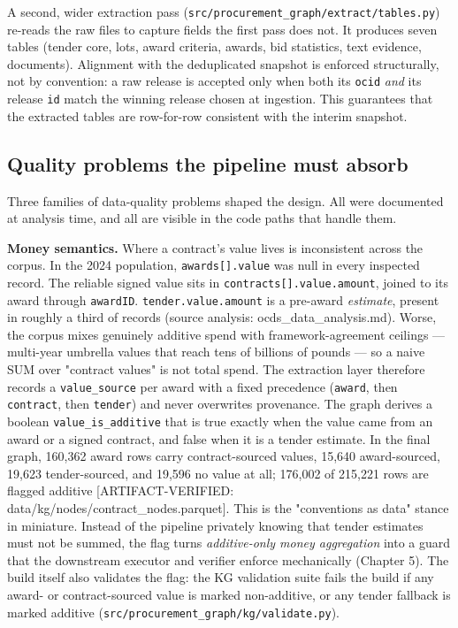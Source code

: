 \documentclass[10pt]{article} %
\begin{document}
A second, wider extraction pass (\texttt{src/procurement\_graph/extract/tables.py}) re-reads the raw files to capture fields the first pass does not. It produces seven tables (tender core, lots, award criteria, awards, bid statistics, text evidence, documents). Alignment with the deduplicated snapshot is enforced structurally, not by convention: a raw release is accepted only when both its \texttt{ocid} \emph{and} its release \texttt{id} match the winning release chosen at ingestion. This guarantees that the extracted tables are row-for-row consistent with the interim snapshot.

\subsection{Quality problems the pipeline must absorb}\label{sec:quality-problems-the-pipeline-must-absor}

Three families of data-quality problems shaped the design. All were documented at analysis time, and all are visible in the code paths that handle them.

\textbf{Money semantics.} Where a contract's value lives is inconsistent across the corpus. In the 2024 population, \texttt{awards[].value} was null in every inspected record. The reliable signed value sits in \texttt{contracts[].value.amount}, joined to its award through \texttt{awardID}. \texttt{tender.value.amount} is a pre-award \emph{estimate}, present in roughly a third of records (source analysis: ocds\_data\_analysis.md). Worse, the corpus mixes genuinely additive spend with framework-agreement ceilings --- multi-year umbrella values that reach tens of billions of pounds --- so a naive SUM over "contract values" is not total spend. The extraction layer therefore records a \texttt{value\_source} per award with a fixed precedence (\texttt{award}, then \texttt{contract}, then \texttt{tender}) and never overwrites provenance. The graph derives a boolean \texttt{value\_is\_additive} that is true exactly when the value came from an award or a signed contract, and false when it is a tender estimate. In the final graph, 160,362 award rows carry contract-sourced values, 15,640 award-sourced, 19,623 tender-sourced, and 19,596 no value at all; 176,002 of 215,221 rows are flagged additive [ARTIFACT-VERIFIED: data/kg/nodes/contract\_nodes.parquet]. This is the "conventions as data" stance in miniature. Instead of the pipeline privately knowing that tender estimates must not be summed, the flag turns \emph{additive-only money aggregation} into a guard that the downstream executor and verifier enforce mechanically (Chapter 5). The build itself also validates the flag: the KG validation suite fails the build if any award- or contract-sourced value is marked non-additive, or any tender fallback is marked additive (\texttt{src/procurement\_graph/kg/validate.py}).
\end{document}
